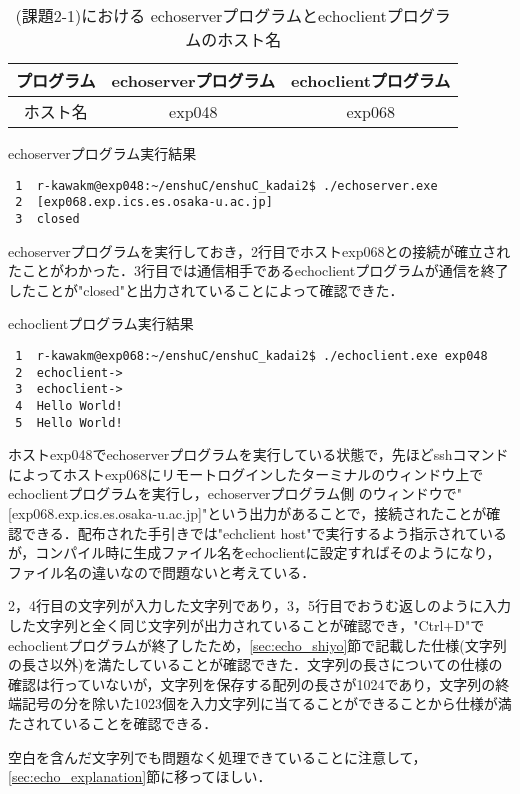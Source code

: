 \documentclass[a4j]{jarticle}
\newenvironment{tab}{\begin{table}}{\end{table}} %
\newenvironment{tabu}{\begin{tabular}}{\end{tabular}} %
\newenvironment{bit}{\begin{breakitembox}}{\end{breakitembox}} %
\newcommand{\esp}{echoserverプログラム}
\newcommand{\ecp}{echoclientプログラム}
\begin{document}
\begin{tab}[htb]
\centering
\begin{tabu}{|c|c|c|}
\hline
プログラム & \esp & \ecp \\
\hline
 ホスト名 & exp048 & exp068 \\
\hline
\end{tabu}
\caption{(課題2-1)における \esp と\ecp のホスト名}
\label{tab:host_name}
\end{tab}

\begin{bit}[l]{\esp 実行結果}
\begin{verbatim}
 1	r-kawakm@exp048:~/enshuC/enshuC_kadai2$ ./echoserver.exe
 2	[exp068.exp.ics.es.osaka-u.ac.jp]
 3  closed
\end{verbatim}
\end{bit}

\esp を実行しておき，2行目でホストexp068との接続が確立されたことがわかった．3行目では通信相手である\ecp が通信を終了したことが"closed"と出力されていることによって確認できた．

\begin{bit}[l]{\ecp 実行結果}
\begin{verbatim}
 1	r-kawakm@exp068:~/enshuC/enshuC_kadai2$ ./echoclient.exe exp048
 2	echoclient->
 3	echoclient->
 4  Hello World!
 5  Hello World!
\end{verbatim}
\end{bit}

ホストexp048で\esp を実行している状態で，先ほどsshコマンドによってホストexp068にリモートログインしたターミナルのウィンドウ上で\ecp を実行し，\esp 側 のウィンドウで"[exp068.exp.ics.es.osaka-u.ac.jp]"という出力があることで，接続されたことが確認できる．配布された手引きでは"echclient host"で実行するよう指示されているが，コンパイル時に生成ファイル名をechoclientに設定すればそのようになり，ファイル名の違いなので問題ないと考えている．

2，4行目の文字列が入力した文字列であり，3，5行目でおうむ返しのように入力した文字列と全く同じ文字列が出力されていることが確認でき，"Ctrl+D"で\ecp が終了したため，\ref{sec:echo_shiyo}節で記載した仕様(文字列の長さ以外)を満たしていることが確認できた．文字列の長さについての仕様の確認は行っていないが，文字列を保存する配列の長さが1024であり，文字列の終端記号の分を除いた1023個を入力文字列に当てることができることから仕様が満たされていることを確認できる．

空白を含んだ文字列でも問題なく処理できていることに注意して，\ref{sec:echo_explanation}節に移ってほしい．
\end{document}
